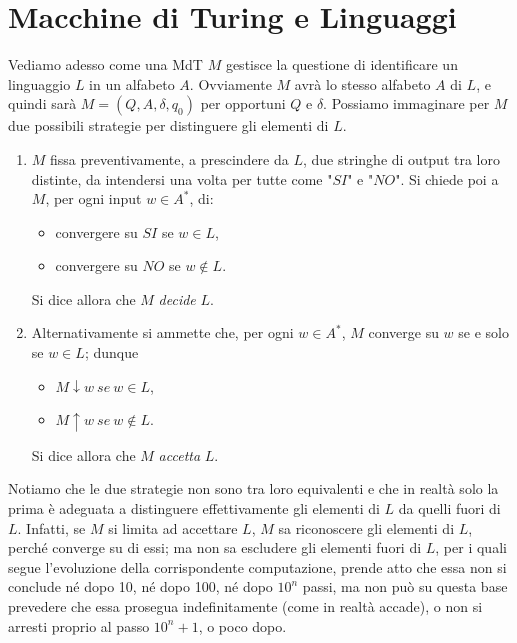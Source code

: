 \section{Macchine di Turing e Linguaggi}

Vediamo adesso come una MdT $M$ gestisce la questione di identificare un linguaggio
$L$ in un alfabeto $A$. Ovviamente $M$ avrà lo stesso alfabeto $A$ di $L$, e quindi
sarà $M = (Q, A, \delta, q_0)$ per opportuni $Q$ e $\delta$. Possiamo immaginare per
$M$ due possibili strategie per distinguere gli elementi di $L$.

\begin{enumerate}
    \item $M$ fissa preventivamente, a prescindere da $L$, due stringhe di output
          tra loro distinte, da intendersi una volta per tutte come "$SI$" e "$NO$".
          Si chiede poi a $M$, per ogni input $w \in A^*$, di:
          \begin{itemize}
              \item convergere su $SI$ se $w \in L$,
              \item convergere su $NO$ se $w \notin L$.
          \end{itemize}
          Si dice allora che $M$ \textit{decide} $L$.
    \item Alternativamente si ammette che, per ogni $w \in A^*$, $M$ converge su
          $w$ se e solo se $w \in L$; dunque
          \begin{itemize}
              \item $M \downarrow w \ se \ w \in L$,
              \item $M \uparrow w \ se \ w \notin L$.
          \end{itemize}
          Si dice allora che $M$ \textit{accetta} $L$.
\end{enumerate}

Notiamo che le due strategie non sono tra loro equivalenti e che in realtà solo la
prima è adeguata a distinguere effettivamente gli elementi di $L$ da quelli fuori di
$L$. Infatti, se $M$ si limita ad accettare $L$, $M$ sa riconoscere gli elementi
di $L$, perché converge su di essi; ma non sa escludere gli elementi fuori di $L$,
per i quali segue l'evoluzione della corrispondente computazione, prende atto che
essa non si conclude né dopo 10, né dopo 100, né dopo $10^n$ passi, ma non può su
questa base prevedere che essa prosegua indefinitamente (come in realtà accade), o
non si arresti proprio al passo $10^n + 1$, o poco dopo.

